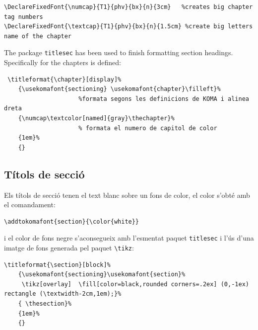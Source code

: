 \documentclass[a4paper,
                             twoside,
                             BCOR1.0cm,
                             DIV11,
                             parskip=full,
                             11pt]{scrbook}
\begin{document}
\begin{scriptsize}
\begin{verbatim}
\DeclareFixedFont{\numcap}{T1}{phv}{bx}{n}{3cm}   %creates big chapter tag numbers
\DeclareFixedFont{\textcap}{T1}{phv}{bx}{n}{1.5cm} %create big letters name of the chapter
\end{verbatim}
\end{scriptsize}
The package \verb+titlesec+ has been used to finish formatting section headings. Specifically for the chapters is defined:
\begin{scriptsize}
\begin{verbatim}
 \titleformat{\chapter}[display]%              
    {\usekomafont{sectioning} \usekomafont{chapter}\filleft}% 
                     %formata segons les definicions de KOMA i alinea dreta
    {\numcap\textcolor[named]{gray}\thechapter}%                   
                     % formata el numero de capitol de color
    {1em}%
    {}
\end{verbatim}
\end{scriptsize}

\subsection{Títols de secció}\label{sbsec:titsec}
Els títols de secció tenen el text blanc sobre un fons de color, el color s'obté amb el comandament:
\begin{scriptsize}
\begin{verbatim}
\addtokomafont{section}{\color{white}}
\end{verbatim}
\end{scriptsize}
i el color de fons negre s'aconsegueix amb l'esmentat paquet \verb+titlesec+ i l'ús d'una imatge de fons generada pel paquet \verb+\tikz+:
\begin{tiny}
\begin{verbatim}
\titleformat{\section}[block]%              
    {\usekomafont{sectioning}\usekomafont{section}% 
     \tikz[overlay]  \fill[color=black,rounded corners=.2ex] (0,-1ex) rectangle (\textwidth-2cm,1em);}%  
    { \thesection}%                   
    {1em}%
    {}
\end{verbatim}
\end{tiny}
\end{document}
